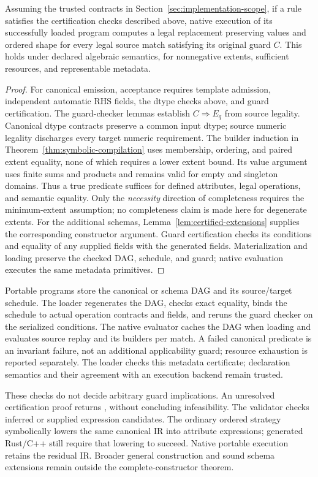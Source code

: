 \begin{theorem}
\label{thm:accepted-core}
Assuming the trusted contracts in Section~\ref{sec:implementation-scope}, if
a rule satisfies the certification checks described above, native execution of its successfully
loaded program computes a legal replacement preserving values and ordered
shape for every legal source match satisfying its original guard $C$.
This holds under declared algebraic semantics, for nonnegative extents,
sufficient resources, and representable metadata.
\end{theorem}
\begin{proof}
For canonical emission, acceptance requires template admission, independent
automatic RHS fields, the dtype checks above, and guard certification. The
guard-checker lemmas establish $C\Rightarrow E_q$ from source legality.
Canonical dtype contracts preserve a common input dtype; source numeric
legality discharges every target numeric requirement.
The builder induction in Theorem~\ref{thm:symbolic-compilation} uses membership,
ordering, and paired extent equality, none of which requires a lower
extent bound. Its value argument uses finite sums and products and remains
valid for empty and singleton domains. Thus a true predicate suffices for
defined attributes, legal operations, and semantic equality. Only the
\emph{necessity} direction of completeness requires the minimum-extent
assumption; no completeness claim is made here for degenerate extents.
For the additional schemas, Lemma~\ref{lem:certified-extensions} supplies
the corresponding constructor argument. Guard certification checks its
conditions and equality of any supplied fields with the generated fields.
Materialization and loading preserve the checked DAG, schedule, and guard;
native evaluation executes the same metadata primitives.
\end{proof}

Portable programs store the canonical or schema DAG and its source/target schedule.
The loader regenerates the DAG, checks exact equality, binds the schedule
to actual operation contracts and fields, and reruns the guard checker on
the serialized conditions. The native evaluator caches the DAG when loading
and evaluates source replay and its builders per match. A failed canonical
predicate is an invariant failure, not an additional applicability guard;
resource exhaustion is reported separately. The loader checks this metadata
certificate; declaration semantics and their agreement with an execution
backend remain trusted.

These checks do not decide arbitrary guard implications. An unresolved
certification proof returns , without concluding infeasibility.
The validator checks inferred or supplied expression candidates. The
ordinary ordered strategy symbolically lowers the same canonical IR into
attribute expressions; generated Rust/C++ still require that lowering to succeed. Native
portable execution retains the residual IR. Broader general construction and
sound schema extensions remain outside the complete-constructor theorem.

